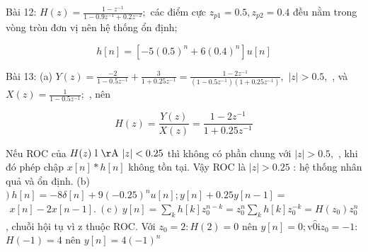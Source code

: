 \documentclass[
  10
]{article}
\begin{document}
Bài 12:
\(H ( z ) = { \frac { 1 - z ^ { - 1 } } { 1 - 0 . 9 z ^ { - 1 } + 0 . 2 z ^ { - 2 } } } ;\)
các điểm cực \(z _ { p 1 } = 0 . 5 , z _ { p 2 } = 0 . 4\) đều nằm trong
vòng tròn đơn vị nên hệ thống ổn định;

\[
h [ n ] = \left[ - 5 (0. 5) ^ {n} + 6 (0. 4) ^ {n} \right] u [ n ]
\]

Bài 13: (a)
\(Y ( z ) = { \frac { - 2 } { 1 - 0 . 5 z ^ { - 1 } } } + { \frac { 3 } { 1 + 0 . 2 5 z ^ { - 1 } } } = { \frac { 1 - 2 z ^ { - 1 } } { ( 1 - 0 . 5 z ^ { - 1 } ) ( 1 + 0 . 2 5 z ^ { - 1 } ) } } ,\)
\(| z | > 0 . 5 ,\) , và
\(X ( z ) = { \frac { 1 } { 1 - 0 . 5 z ^ { - 1 } } } ;\) , nên

\[
H (z) = \frac {Y (z)}{X (z)} = \frac {1 - 2 z ^ {- 1}}{1 + 0 . 2 5 z ^ {- 1}}
\]

Nếu ROC của \(H ( z ) \mathrm { ~ l ~ \AA ~ } | z | < 0 . 2 5\) thì
không có phần chung với \(| z | > 0 . 5 ,\) , khi đó phép chập
\(x [ n ] * h [ n ]\) không tồn tại. Vậy ROC là \(| z | > 0 . 2 5\) : hệ
thống nhân quả và ổn định. (b)
\() \  h [ n ] = - 8 \delta [ n ] + 9 ( - 0 . 2 5 ) ^ { n } u [ n ] ; y [ n ] + 0 . 2 5 y [ n - 1 ] =\)
\(\begin{array} { r } { x [ n ] - 2 x [ n - 1 ] . \mathrm { ~ ( c ) ~ } y [ n ] = \sum _ { k } h [ k ] z _ { 0 } ^ { n - k } = z _ { 0 } ^ { n } \sum _ { k } h [ k ] z _ { 0 } ^ { - k } = H ( z _ { 0 } ) z _ { 0 } ^ { n } } \end{array}\)
, chuỗi hội tụ vì z thuộc ROC. Với \(z _ { 0 } = 2 \colon H ( 2 ) = 0\)
nên
\(y [ n ] = 0 ; { \mathrm { v } } { \hat { 0 } } { \mathrm { i } } z _ { 0 } = - 1 { \mathrm { : } }\)
\(H ( - 1 ) = 4\) nên \(y [ n ] = 4 ( - 1 ) ^ { n }\)
\end{document}
